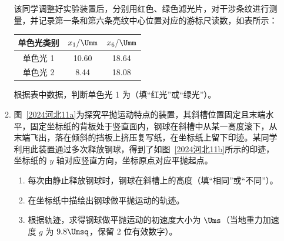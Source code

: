 \documentclass[\gkver]{gaokaozhenti}
\begin{document}
\begin{enumerate}
\begin{enumerate}
	该同学调整好实验装置后，分别用红色、绿色滤光片，对干涉条纹进行测量，并记录第一条和第六条亮纹中心位置对应的游标尺读数，如表所示：
	\begin{center}
	\begin{tabular}{|c|c|c|}
	\hline
	单色光类别 & $x_{1}/\Umm$ & $x_{6}/\Umm$ \\ \hline
	单色光 1 & 10.60 & 18.64 \\ \hline
	单色光 2 & 8.44 & 18.08 \\ \hline
	\end{tabular}
	\end{center}
	根据表中数据，判断单色光 1 为（填“红光”或“绿光”）。
	\item
	图~\ref{2024河北11a}为探究平抛运动特点的装置，其斜槽位置固定且末端水平，固定坐标纸的背板处于竖直面内，钢球在斜槽中从某一高度滚下，从末端飞出，落在倾斜的挡板上挤压复写纸，在坐标纸上留下印迹。某同学利用此装置通过多次释放钢球，得到了如图~\ref{2024河北11b}所示的印迹，坐标纸的 $y$ 轴对应竖直方向，坐标原点对应平抛起点。
	\begin{enumerate}
		\item
		每次由静止释放钢球时，钢球在斜槽上的高度（填“相同”或“不同”）。
		\item
		在坐标纸中描绘出钢球做平抛运动的轨迹。
		\item
		根据轨迹，求得钢球做平抛运动的初速度大小为 $\Ums$（当地重力加速度 $g$ 为 $9.8 \Umsq$，保留 2 位有效数字）。
	\end{enumerate}
\end{enumerate}

\end{enumerate}
\end{document}
